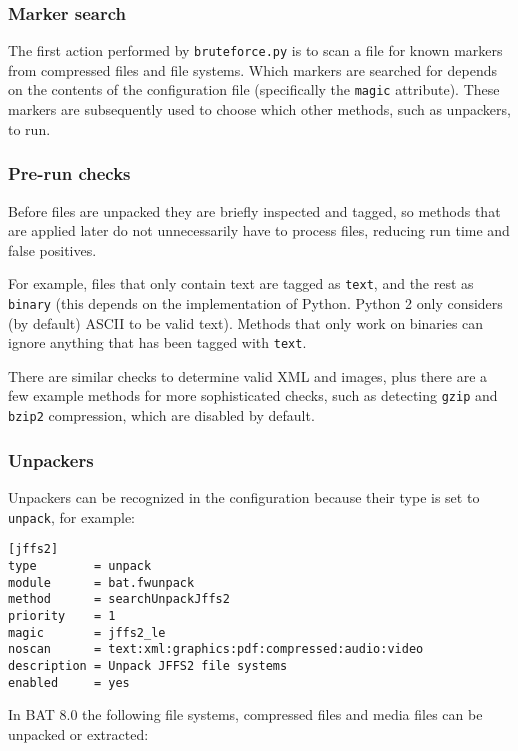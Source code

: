 \documentclass[10pt]{article}
\begin{document}
\subsubsection{Marker search}

The first action performed by \texttt{bruteforce.py} is to scan a file for
known markers from compressed files and file systems. Which markers are
searched for depends on the contents of the configuration file (specifically
the \texttt{magic} attribute). These markers are subsequently used to choose
which other methods, such as unpackers, to run.

\subsubsection{Pre-run checks}

Before files are unpacked they are briefly inspected and tagged, so methods
that are applied later do not unnecessarily have to process files, reducing
run time and false positives.

For example, files that only contain text are tagged as \texttt{text}, and the
rest as \texttt{binary} (this depends on the implementation of Python. Python 2
only considers (by default) ASCII to be valid text). Methods that only work on
binaries can ignore anything that has been tagged with \texttt{text}.

There are similar checks to determine valid XML and images, plus there are a
few example methods for more sophisticated checks, such as detecting
\texttt{gzip} and \texttt{bzip2} compression, which are disabled by default.

\subsubsection{Unpackers}

Unpackers can be recognized in the configuration because their type is set
to \texttt{unpack}, for example:

\begin{verbatim}
[jffs2]
type        = unpack
module      = bat.fwunpack
method      = searchUnpackJffs2
priority    = 1
magic       = jffs2_le
noscan      = text:xml:graphics:pdf:compressed:audio:video
description = Unpack JFFS2 file systems
enabled     = yes
\end{verbatim}

In BAT 8.0 the following file systems, compressed files and media files can be
unpacked or extracted:
\end{document}
